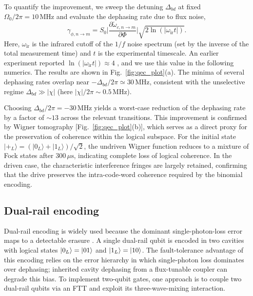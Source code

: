 To quantify the improvement, we sweep the detuning \(\Delta_{bd}\) at fixed \(\Omega_0/2\pi = 10\,\mathrm{MHz}\) and evaluate the dephasing rate due to flux noise,
\begin{equation}
\gamma_{\phi,{n\rightarrow m}}= S_0\bigg|\frac{\partial \widetilde{\omega}_{c,n\rightarrow m}}{\partial \Phi}\bigg|\sqrt{2\ln(|\omega_\text{ir}t|)}.
\end{equation}
Here, \(\omega_\text{ir}\) is the infrared cutoff of the \(1/f\) noise spectrum (set by the inverse of the total measurement time) and \(t\) is the experimental timescale. An earlier experiment reported \(\ln(|\omega_\text{ir} t|)\approx 4\) \cite{PhysRevX.7.031037factor4}, and we use this value in the following numerics. The results are shown in Fig.~\ref{fig:qec_plot}(a). The minima of several dephasing rates overlap near \(-\Delta_{bd}/2\pi \simeq 30\,\mathrm{MHz}\), consistent with the unselective regime \(\Delta_{bd}\gg |\chi|\) (here \(|\chi|/2\pi \sim 0.5\,\mathrm{MHz}\)).

Choosing \(\Delta_{bd}/2\pi = -30\,\mathrm{MHz}\) yields a worst-case reduction of the dephasing rate by a factor of \(\sim 13\) across the relevant transitions. This improvement is confirmed by Wigner tomography [Fig.~\ref{fig:qec_plot}(b)], which serves as a direct proxy for the preservation of coherence within the logical subspace. For the initial state \(|+_L\rangle = (|0_L\rangle + |1_L\rangle)/\sqrt{2}\), the undriven Wigner function reduces to a mixture of Fock states after \(300\,\mu\mathrm{s}\), indicating complete loss of logical coherence. In the driven case, the characteristic interference fringes are largely retained, confirming that the drive preserves the intra-code-word coherence required by the binomial encoding.

\subsection{Dual-rail encoding}
Dual-rail encoding is widely used because the dominant single-photon-loss error maps to a detectable erasure \cite{dualrailcavity1,teoh2023dual}. A single dual-rail qubit is encoded in two cavities with logical states \(|0_L\rangle=|01\rangle\) and \(|1_L\rangle=|10\rangle\). The fault-tolerance advantage of this encoding relies on the error hierarchy in which single-photon loss dominates over dephasing; inherited cavity dephasing from a flux-tunable coupler can degrade this bias. To implement two-qubit gates, one approach is to couple two dual-rail qubits via an FTT and exploit its three-wave-mixing interaction.

